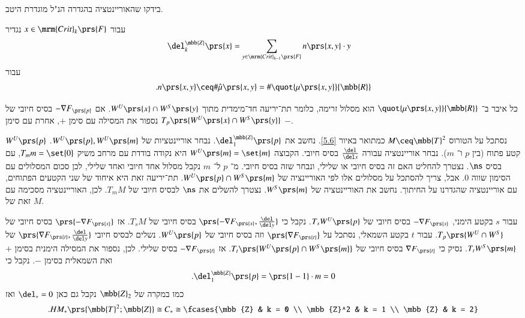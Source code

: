 \documentclass[a4paper,10pt,twoside,openany]{book}
\begin{document}
\begin{exercise}
בידקו שהאוריינטציה בהגדרה הנ"ל מוגדרת היטב.
\end{exercise}

\begin{definition}
עבור
$x \in \mrm{Crit}_k\prs{F}$
נגדיר
\begin{align*}
\del_k^{\mbb{Z}} \prs{x} &= \sum_{y \in \mrm{Crit}_{k-1}\prs{F}} n\prs{x,y} \cdot y
\end{align*}
עבור
\begin{align*}
\text{.} n\prs{x,y} \ceq \# \hat{\mu}\prs{x,y} = \# \quot{\mu\prs{x,y}}{\mbb{R}}
\end{align*}
\end{definition}

\begin{remark}
כל איבר ב־%
$\quot{\mu\prs{x,y}}{\mbb{R}}$
הוא מסלול זרימה, כלומר תת־יריעה חד־מימדית מתוך
$W^U\prs{x} \cap W^S\prs{y}$.
אם
$- \nabla F_{\prs{p}}$
בסיס חיובי של
$T_p\prs{W^U\prs{x} \cap W^S\prs{y}}$
נספור את המסילה עם סימן
$+$,
אחרת עם סימן
$-$.
\end{remark}

\begin{example}
נסתכל על הטורוס
$M \ceq \mbb{T}^2$
כמתואר באיור
\ref{5.6}.
נחשב את
$\del_1^{\mbb{Z}}\prs{p}$.
נבחר אוריינטציות של
$W^U\prs{p}, W^U\prs{m}$.
$W^U\prs{p}$
קטע פתוח (בין $p$
ו־%
$m$).
נבחר אוריינטציה עבורה
$\frac{\del}{\del x}$
בסיס חיובי.
הקבוצה
$W^U\prs{m} = \set{m}$
היא נקודה בודדת עם מרחב משיק
$T_m m = \set{0}$,
עם בסיס
$\ns$.
נצטרך להחליט האם זה בסיס חיובי או שלילי, ונבחר שזה בסיס חיובי.
מ־%
$p$
ל־%
$m$
נקבל מסלול אחד חיובי ואחד שלילי, לכן סכום המסלולים עם הסימון שווה
$0$.
אבל, צריך להסתכל על מסלולים אלו לפי האוריינציה של
$W^U\prs{p} \cap W^S\prs{m}$.
תת־יריעה זאת היא איחוד של שני הקטעים הפתוחים, עם אוריינטציה שהגדרנו על החיתוך.
נחשב את האוריינטציה של
$W^S\prs{m}$.
נצטרך להשלים את
$\ns$
לבסיס חיובי של
$T_m M$.
לכן, האוריינטציה מסכימה עם זאת של
$M$.

עבור
$s$
בקטע הימני,
$-\nabla F_{\prs{s}}$
בסיס חיובי של
$T_s W^U\prs{p}$.
נקבל כי
$\prs{-\nabla F_{\prs{s}}, \frac{\del}{\del y}}$
בסיס חיובי של
$T_s M$.
אז
$\prs{-\nabla F_{\prs{s}}}$
בסיס חיובי של
$T_p\prs{W^U \cap W^S}$.
עבור
$t$
בקטע השמאלי, נסתכל על
$\prs{\nabla F_{\prs{t}}}$
וזה בסיס חיובי של
$W^U\prs{p}$.
נשלים לבסיס חיובי
$\prs{\nabla F_{\prs{t}}, \frac{\del}{\del y}}$
של
$T_t W^S\prs{m}$.
נסיק כי
$\nabla F_{\prs{t}}$
בסיס חיובי של
$T_t\prs{W^U\prs{p} \cap W^S\prs{m}}$.
אז
$-\nabla F_{\prs{t}}$
בסיס שלילי.
לכן, נספור את המסילה הימנית בסימן
$+$
ואת השמאלית בסימן
$-$.
נקבל כי
\[\text{.} \del_1^{\mbb{Z}}\prs{p} = \prs{1-1} \cdot m = 0\]
כמו במקרה של
$\mbb{Z}_2$
נקבל גם כאן
$\del_* = 0$
ואז
\[\text{.} HM_* \prs{\mbb{T}^2; \mbb{Z}} \cong C_* \cong \fcases{\mbb{Z} & k = 0 \\ \mbb{Z}^2 & k = 1 \\ \mbb{Z} & k = 2}\]
\end{example}
\end{document}

